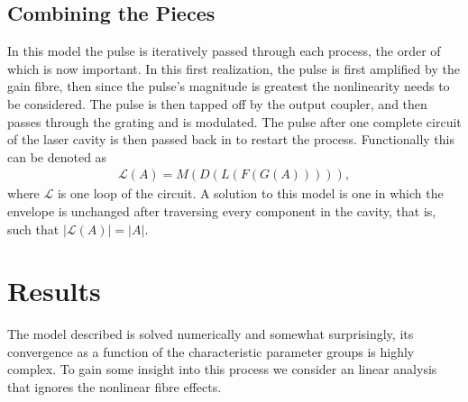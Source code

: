 \documentclass[12pt]{article}
\begin{document}
\subsection{Combining the Pieces}
In this model the pulse is iteratively passed through each process, the order of which is now
important.  In this first realization, the pulse is first
amplified by the gain fibre, then since the pulse's magnitude is greatest the nonlinearity 
needs to be considered. The pulse is then tapped off by the output coupler, and then passes 
through the grating and is modulated. The pulse after one complete circuit of the laser 
cavity is then passed back in to restart the process. Functionally this can be denoted as
\begin{align*}
	\mathcal{L}(A) = M(D(L(F(G(A))))),
\end{align*}
where $\mathcal{L}$ is one loop of the circuit. A solution to this model is one in which the 
envelope is unchanged after traversing every component in the cavity, that is, such 
that $|\mathcal{L}(A)| = |A|$.




\section{Results}
The model described is solved numerically and somewhat surprisingly, its convergence as a function
of the characteristic parameter groups is highly complex.  To gain some insight into this process
we consider an linear analysis that ignores the nonlinear fibre effects.
\end{document}
